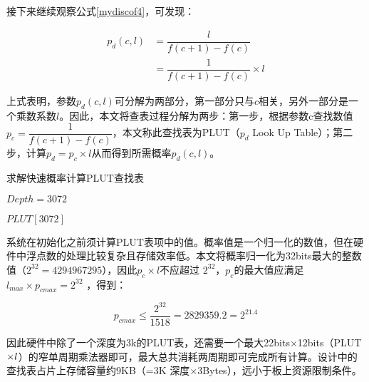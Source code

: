 接下来继续观察公式\ref{mydiscof4}，可发现：

\begin{align}\label{mydiscof5}
p_d(c,l) &= \dfrac{l}{f(c+1)-f(c)}   \nonumber \\
&= \dfrac{1}{f(c+1)-f(c)} \times l 
\end{align}

上式表明，参数$ p_d(c,l) $可分解为两部分，第一部分只与$ c $相关，另外一部分是一个乘数系数$l$。因此，本文将查表过程分解为两步：第一步，根据参数c查找数值$ p_c= \dfrac{1}{f(c+1)-f(c)} $，本文称此查找表为PLUT（$p_d$ Look Up Table）；第二步，计算$ p_d = p_c \times l $从而得到所需概率$ p_d(c,l) $。

\begin{algorithm}[ht]
	\caption{求解快速概率计算PLUT查找表  \label{mydiscoa3}}
	\IncMargin{2em}
	\DontPrintSemicolon
	$Depth = 3072 $ 
	
	$ PLUT[3072] $
	
\end{algorithm}



系统在初始化之前须计算PLUT表项中的值。概率值是一个归一化的数值，但在硬件中浮点数的处理比较复杂且存储效率低。本文将概率归一化为32bits最大的整数值（$2^{32}=4294967295$），因此$ p_c \times l  $不应超过 $ 2^{32} $，$ p_c $的最大值应满足$ l_{max} \times p_{cmax} = 2^{32 } $ ，得到：

\begin{equation} \label{mydiscof6}
p_{cmax} \leq \dfrac{2^{32}}{1518} =2829359.2=2^{21.4}
\end{equation}



因此硬件中除了一个深度为3k的PLUT表，还需要一个最大22bits$\times$12bits（PLUT$\times \\
 l$）的窄单周期乘法器即可，最大总共消耗两周期即可完成所有计算。设计中的查找表占片上存储容量约9KB（=3K 深度$\times$3Bytes），远小于板上资源限制条件。


